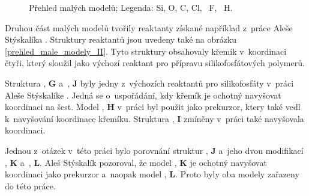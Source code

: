\documentclass[
digital, %
table,   %
lof,     %
lot,     %
oneside,
]{fithesis3}
\begin{document}
\begin{figure}
\caption{Přehled malých modelů; Legenda:  Si,  O,  C,  Cl, ~F, ~H.}
\label{prehled_male_modely}
\end{figure}

Druhou část malých modelů tvořily reaktanty získané například z~práce Aleše Stýskalíka \cite{Styskalik2015thesis}. Struktury reaktantů jsou uvedeny také na obrázku \ref{prehled_male_modely_II}. Tyto struktury obsahovaly křemík v~koordinaci čtyři, který sloužil jako výchozí reaktant pro přípravu silikofosfátových polymerů.

 Struktura , \textbf{G} a~,  \textbf{J}  byly jedny z~výchozích reaktantů pro silikofosfáty v~práci Aleše Stýskalíke \cite{Styskalik2015thesis}. Jedná se o~uspořádání, kdy křemík je ochotný navyšovat koordinaci na šest. Model ,  \textbf{H} v~práci \cite{aksamentova2009synthesis} byl použit jako prekurzor, ktery také vedl k~navyšování koordinace křemíku. Struktura , \textbf{I} zmíněny v~práci \cite{Styskalik2015thesis} také navyšovala koordinaci.

 Jednou z~otázek v~této práci bylo porovnání struktur ,  \textbf{J} a~jeho dvou modifikací ,  \textbf{K} a~,  \textbf{L}. Aleš Stýskalík pozoroval, že model ,  \textbf{K} je ochotný navyšovat koordinaci jako prekurzor a~naopak model ,  \textbf{L}. Proto byly oba modely zařazeny do této práce.
\end{document}
